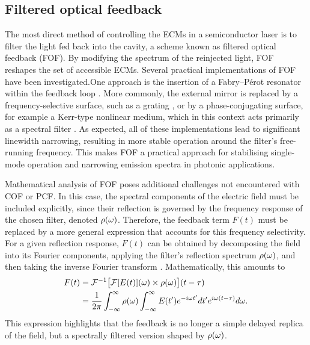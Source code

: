 \subsection*{Filtered optical feedback}
\label{subsec:FOF}
%
The most direct method of controlling the ECMs in a semiconductor laser is to filter the light fed back into the cavity, a scheme known as filtered optical feedback (FOF).
By modifying the spectrum of the reinjected light, FOF reshapes the set of accessible ECMs.
Several practical implementations of FOF have been investigated.One approach is the insertion of a Fabry–Pérot resonator within the feedback loop \cite{detienne1997semiconductor}.
More commonly, the external mirror is replaced by a frequency-selective surface, such as a grating \cite{dahmani1987frequency, harvey1991external, jin1996single}, or by a phase-conjugating surface, for example a Kerr-type nonlinear medium, which in this context acts primarily as a spectral filter \cite{agrawal1984line}.
As expected, all of these implementations lead to significant linewidth narrowing, resulting in more stable operation around the filter’s free-running frequency.
This makes FOF a practical approach for stabilising single-mode operation and narrowing emission spectra in photonic applications.
%
\par
%
Mathematical analysis of FOF poses additional challenges not encountered with COF or PCF.
In this case, the spectral components of the electric field must be included explicitly, since their reflection is governed by the frequency response of the chosen filter, denoted $\rho(\omega)$.
Therefore, the feedback term $F(t)$ must be replaced by a more general expression that accounts for this frequency selectivity.
For a given reflection response, $F(t)$ can be obtained by decomposing the field into its Fourier components, applying the filter’s reflection spectrum $\rho(\omega)$, and then taking the inverse Fourier transform \cite{yousefi1999dynamical}.
Mathematically, this amounts to
%
\begin{equation}
    \begin{aligned}
    \label{eq:FOF}
         F(t) &=  \mathcal{F}^{-1}\big[ \mathcal{F}[E(t)](\omega) \times \rho(\omega) \big](t-\tau)\\
              &= \frac{1}{2\pi} \int_{-\infty}^{\infty} \rho(\omega) \int_{-\infty}^{\infty} E(t') e^{-i \omega t'} dt' e^{i \omega (t-\tau)} d\omega.
    \end{aligned}
\end{equation}
%
This expression highlights that the feedback is no longer a simple delayed replica of the field, but a spectrally filtered version shaped by $\rho(\omega)$.
